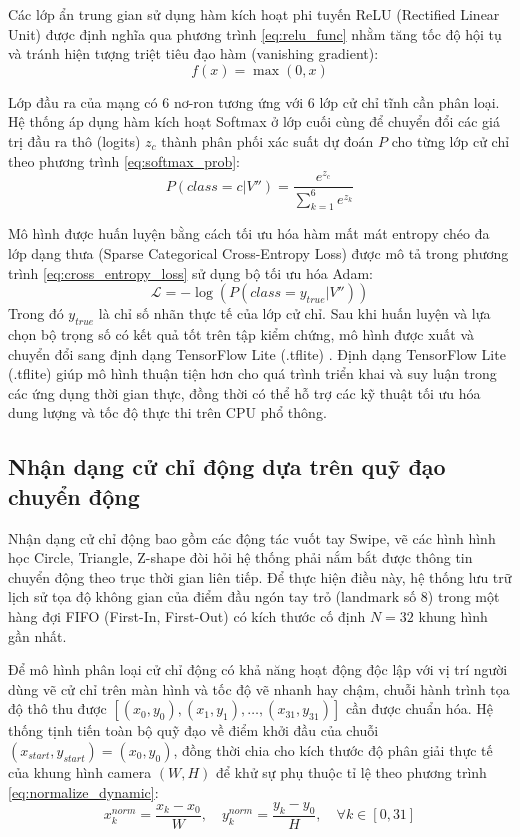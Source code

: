 \documentclass[../BTL.tex]{subfiles}
\begin{document}
Các lớp ẩn trung gian sử dụng hàm kích hoạt phi tuyến ReLU (Rectified Linear Unit) được định nghĩa qua phương trình \eqref{eq:relu_func} nhằm tăng tốc độ hội tụ và tránh hiện tượng triệt tiêu đạo hàm (vanishing gradient):
\begin{equation}
\label{eq:relu_func}
f(x) = \max(0, x)
\end{equation}

Lớp đầu ra của mạng có 6 nơ-ron tương ứng với 6 lớp cử chỉ tĩnh cần phân loại. Hệ thống áp dụng hàm kích hoạt Softmax ở lớp cuối cùng để chuyển đổi các giá trị đầu ra thô (logits) $z_c$ thành phân phối xác suất dự đoán $P$ cho từng lớp cử chỉ theo phương trình \eqref{eq:softmax_prob}:
\begin{equation}
\label{eq:softmax_prob}
P(class = c | V'') = \frac{e^{z_c}}{\sum_{k=1}^{6} e^{z_k}}
\end{equation}

Mô hình được huấn luyện bằng cách tối ưu hóa hàm mất mát entropy chéo đa lớp dạng thưa (Sparse Categorical Cross-Entropy Loss) được mô tả trong phương trình \eqref{eq:cross_entropy_loss} sử dụng bộ tối ưu hóa Adam:
\begin{equation}
\label{eq:cross_entropy_loss}
\mathcal{L} = -\log(P(class = y_{true} | V''))
\end{equation}
Trong đó $y_{true}$ là chỉ số nhãn thực tế của lớp cử chỉ. Sau khi huấn luyện và lựa chọn bộ trọng số có kết quả tốt trên tập kiểm chứng, mô hình được xuất và chuyển đổi sang định dạng TensorFlow Lite (.tflite) \cite{tflite2017}. Định dạng TensorFlow Lite (.tflite) giúp mô hình thuận tiện hơn cho quá trình triển khai và suy luận trong các ứng dụng thời gian thực, đồng thời có thể hỗ trợ các kỹ thuật tối ưu hóa dung lượng và tốc độ thực thi trên CPU phổ thông.

\subsection{Nhận dạng cử chỉ động dựa trên quỹ đạo chuyển động}
Nhận dạng cử chỉ động bao gồm các động tác vuốt tay Swipe, vẽ các hình hình học Circle, Triangle, Z-shape đòi hỏi hệ thống phải nắm bắt được thông tin chuyển động theo trục thời gian liên tiếp. Để thực hiện điều này, hệ thống lưu trữ lịch sử tọa độ không gian của điểm đầu ngón tay trỏ (landmark số 8) trong một hàng đợi FIFO (First-In, First-Out) có kích thước cố định $N = 32$ khung hình gần nhất. 

Để mô hình phân loại cử chỉ động có khả năng hoạt động độc lập với vị trí người dùng vẽ cử chỉ trên màn hình và tốc độ vẽ nhanh hay chậm, chuỗi hành trình tọa độ thô thu được $[(x_0, y_0), (x_1, y_1), \dots, (x_{31}, y_{31})]$ cần được chuẩn hóa. Hệ thống tịnh tiến toàn bộ quỹ đạo về điểm khởi đầu của chuỗi $(x_{start}, y_{start}) = (x_0, y_0)$, đồng thời chia cho kích thước độ phân giải thực tế của khung hình camera $(W, H)$ để khử sự phụ thuộc tỉ lệ theo phương trình \eqref{eq:normalize_dynamic}:
\begin{equation}
\label{eq:normalize_dynamic}
x^{norm}_k = \frac{x_k - x_0}{W}, \quad y^{norm}_k = \frac{y_k - y_0}{H}, \quad \forall k \in [0, 31]
\end{equation}
\end{document}
